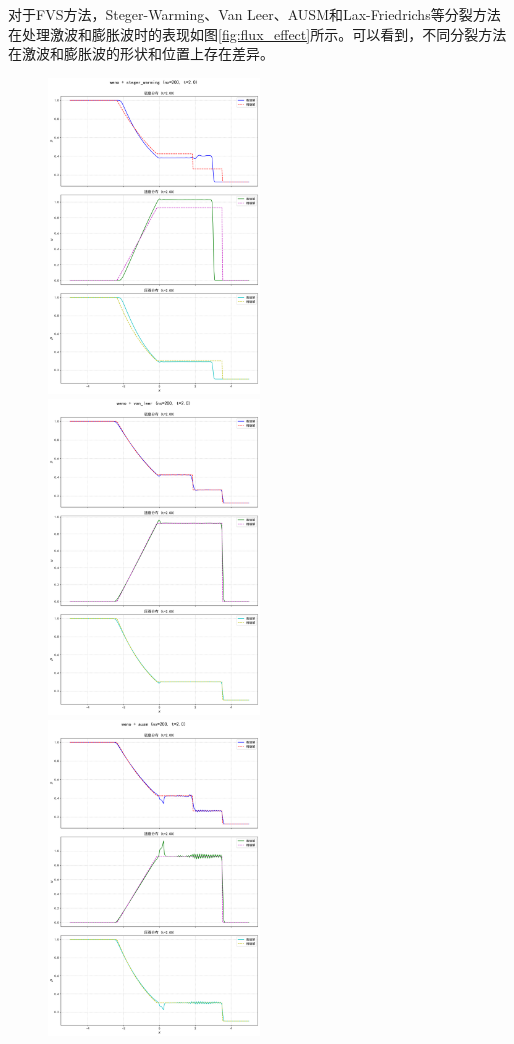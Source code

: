 \documentclass[UTF8]{ctexart}
\begin{document}
对于FVS方法，Steger-Warming、Van Leer、AUSM和Lax-Friedrichs等分裂方法在处理激波和膨胀波时的表现如图\ref{fig:flux_effect}所示。可以看到，不同分裂方法在激波和膨胀波的形状和位置上存在差异。
\begin{figure}
    \includegraphics[width=0.5\textwidth]{steger_warming.png}
    \includegraphics[width=0.5\textwidth]{van_leer.png}\\
    \includegraphics[width=0.5\textwidth]{ausm.png}

\end{figure}
\end{document}
